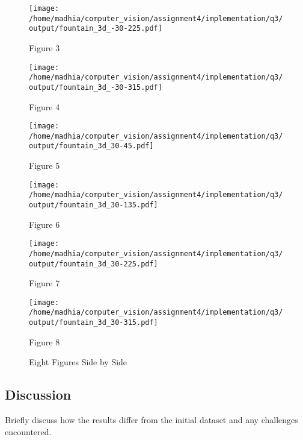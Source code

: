 \documentclass{article}
\begin{document}
\begin{figure}[h!]
    \centering
    \begin{minipage}{0.4\textwidth}
        \centering
        \texttt{[image: /home/madhia/computer\_vision/assignment4/implementation/q3/output/fountain\_3d\_-30-225.pdf]}
        \caption{Figure 3}
    \end{minipage}%
    \begin{minipage}{0.4\textwidth}
        \centering
        \texttt{[image: /home/madhia/computer\_vision/assignment4/implementation/q3/output/fountain\_3d\_-30-315.pdf]}
        \caption{Figure 4}
    \end{minipage}%
\end{figure}
    
\begin{figure}[h!]
    \centering    
    \begin{minipage}{0.4\textwidth}
        \centering
        \texttt{[image: /home/madhia/computer\_vision/assignment4/implementation/q3/output/fountain\_3d\_30-45.pdf]}
        \caption{Figure 5}
    \end{minipage}%
    \begin{minipage}{0.4\textwidth}
        \centering
        \texttt{[image: /home/madhia/computer\_vision/assignment4/implementation/q3/output/fountain\_3d\_30-135.pdf]}
        \caption{Figure 6}
    \end{minipage}%
\end{figure}
    
\begin{figure}[h!]
    \centering    
    \begin{minipage}{0.4\textwidth}
        \centering
        \texttt{[image: /home/madhia/computer\_vision/assignment4/implementation/q3/output/fountain\_3d\_30-225.pdf]}
        \caption{Figure 7}
    \end{minipage}%
    \begin{minipage}{0.4\textwidth}
        \centering
        \texttt{[image: /home/madhia/computer\_vision/assignment4/implementation/q3/output/fountain\_3d\_30-315.pdf]}
        \caption{Figure 8}
    \end{minipage}
    \caption{Eight Figures Side by Side}
\end{figure}

\subsection{Discussion}
Briefly discuss how the results differ from the initial dataset and any challenges encountered.
\end{document}
